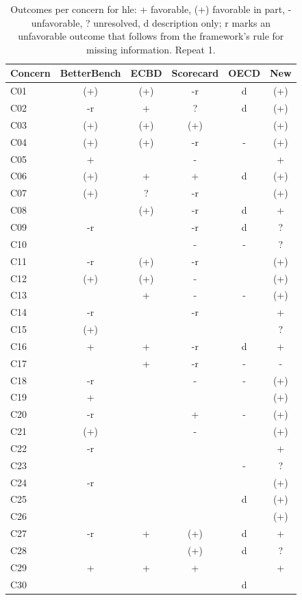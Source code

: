 \begin{table}[t]
\caption{Outcomes per concern for hle: + favorable, (+) favorable in part, - unfavorable, ? unresolved, d description only; r marks an unfavorable outcome that follows from the framework's rule for missing information. Repeat 1.}
\label{tab:grid-hle}
\small\centering\begin{tabular}{lccccc}\toprule
Concern & BetterBench & ECBD & Scorecard & OECD & New \\
\midrule
C01 & (+) & (+) & -r & d & (+) \\
C02 & -r & + & ? & d & (+) \\
C03 & (+) & (+) & (+) &  & (+) \\
C04 & (+) & (+) & -r & - & (+) \\
C05 & + &  & - &  & + \\
C06 & (+) & + & + & d & (+) \\
C07 & (+) & ? & -r &  & (+) \\
C08 &  & (+) & -r & d & + \\
C09 & -r &  & -r & d & ? \\
C10 &  &  & - & - & ? \\
C11 & -r & (+) & -r &  & (+) \\
C12 & (+) & (+) & - &  & (+) \\
C13 &  & + & - & - & (+) \\
C14 & -r &  & -r &  & + \\
C15 & (+) &  &  &  & ? \\
C16 & + & + & -r & d & + \\
C17 &  & + & -r & - & - \\
C18 & -r &  & - & - & (+) \\
C19 & + &  &  &  & (+) \\
C20 & -r &  & + & - & (+) \\
C21 & (+) &  & - &  & (+) \\
C22 & -r &  &  &  & + \\
C23 &  &  &  & - & ? \\
C24 & -r &  &  &  & (+) \\
C25 &  &  &  & d & (+) \\
C26 &  &  &  &  & (+) \\
C27 & -r & + & (+) & d & + \\
C28 &  &  & (+) & d & ? \\
C29 & + & + & + &  & + \\
C30 &  &  &  & d &  \\
\bottomrule\end{tabular}
\end{table}

